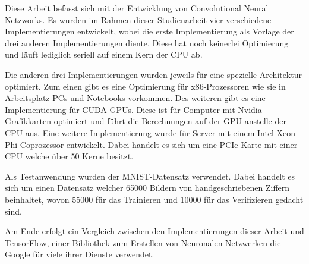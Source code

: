 \documentclass[../main.tex]{subfiles}
\begin{document}
Diese Arbeit befasst sich mit der Entwicklung von Convolutional Neural Netzworks. Es wurden im Rahmen dieser Studienarbeit vier verschiedene Implementierungen entwickelt, wobei die erste Implementierung als Vorlage der drei anderen Implementierungen diente. Diese hat noch keinerlei Optimierung und läuft lediglich seriell auf einem Kern der CPU ab.

Die anderen drei Implementierungen wurden jeweils für eine spezielle Architektur optimiert. Zum einen gibt es eine Optimierung für x86-Prozessoren wie sie in Arbeitsplatz-PCs und Notebooks vorkommen. Des weiteren gibt es eine Implementierung für CUDA-GPUs. Diese ist für Computer mit Nvidia-Grafikkarten optimiert und führt die Berechnungen auf der GPU anstelle der CPU aus. Eine weitere Implementierung wurde für Server mit einem Intel Xeon Phi-Coprozessor entwickelt. Dabei handelt es sich um eine PCIe-Karte mit einer CPU welche über 50 Kerne besitzt.

Als Testanwendung wurden der MNIST-Datensatz verwendet. Dabei handelt es sich um einen Datensatz welcher 65000 Bildern von handgeschriebenen Ziffern beinhaltet, wovon 55000 für das Trainieren und 10000 für das Verifizieren gedacht sind.

Am Ende erfolgt ein Vergleich zwischen den Implementierungen dieser Arbeit und TensorFlow, einer Bibliothek zum Erstellen von Neuronalen Netzwerken die Google für viele ihrer Dienste verwendet.
\end{document}
